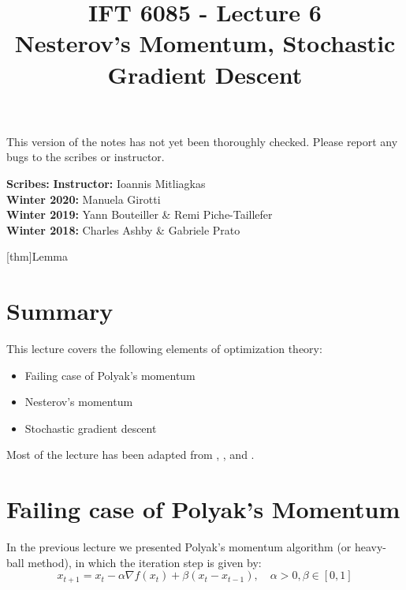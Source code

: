 \documentclass{article}
\title{IFT 6085 - Lecture 6 \\ 
Nesterov's Momentum, Stochastic Gradient Descent }
\date{}
\begin{document}
 

\maketitle


\vspace{-0.5in}
\begin{center}
This version of the notes has not yet been thoroughly checked.
Please report any bugs to the scribes or instructor.
\end{center}
\vspace{0.2in}

\textbf{Scribes:}\hfill
\textbf{Instructor:}  Ioannis Mitliagkas\\
\textbf{Winter 2020:} Manuela Girotti\\
\textbf{Winter 2019:} Yann Bouteiller \& Remi Piche-Taillefer\\
\textbf{Winter 2018:} Charles Ashby \& Gabriele Prato



\newcommand{\infgc}{\inf_{g \in \mathcal{C}}}
\newcommand{\supgc}{\sup_{g \in \mathcal{C}}}

\newcommand{\Prob}{\mathbb{P}}
\newcommand{\E}{\mathbb{E}}
\newcommand{\reals}{\mathbb{R}}

\newtheorem{note}[thm]{Remark}
[thm]{Lemma}

\def\R{\mathbb{R}}
\def\le{\left}
\def\ri{\right}




\section{Summary}

This lecture covers the following elements of optimization theory:

\begin{itemize}
\item Failing case of Polyak's momentum
\item Nesterov's momentum
\item Stochastic gradient descent
\end{itemize}
Most of the lecture has been adapted from \cite{2015arXiv1405.4980v2}, \cite{2014arXiv1408.3595L}, \cite{Nesterov1998} and \cite{Shalev2014}.

\section{Failing case of Polyak's Momentum}
In the previous lecture we presented Polyak's momentum algorithm (or heavy-ball method), in which the iteration step is given by:
\begin{equation} \label{eq:1}
	x_{t+1} = x_t - \alpha \nabla f(x_t) + \beta (x_t - x_{t-1}), \quad  \alpha > 0, \beta \in [0,1]
\end{equation}
\end{document}
